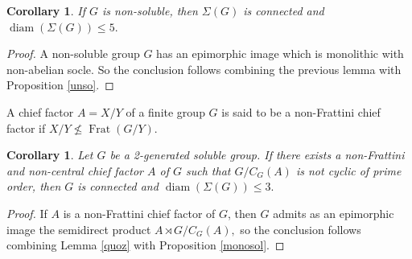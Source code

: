 \documentclass{amsart}
\DeclareMathOperator{\frat}{Frat}
\DeclareMathOperator{\diam}{diam}
\newtheorem{cor}[thm]{Corollary}
\numberwithin{equation}{section}
\begin{document}
\begin{cor} If $G$ is non-soluble, then
	$\Sigma(G)$ is connected and $\diam(\Sigma(G))\leq 5.$
\end{cor}
\begin{proof}
A non-soluble group $G$ has an epimorphic image which is monolithic with non-abelian socle. So the conclusion follows combining the previous lemma with  Proposition \ref{unso}.
\end{proof}

A chief factor $A=X/Y$ of a finite group $G$ is said to be a non-Frattini chief factor if $X/Y \not\leq \frat(G/Y).$


\begin{cor}Let $G$ be a 2-generated soluble group.
If there exists a non-Frattini and non-central chief factor $A$ of $G$ such that $G/C_G(A)$ is not cyclic of prime order, then $G$ is connected and $\diam(\Sigma(G))\leq 3.$
\end{cor}

\begin{proof}
If $A$ is a non-Frattini chief factor of $G$, then $G$ admits as an epimorphic image
the semidirect product $A\rtimes G/C_G(A),$ so  the conclusion follows combining Lemma \ref{quoz} with  Proposition \ref{monosol}.
\end{proof}
\end{document}
